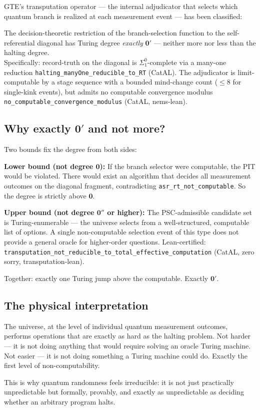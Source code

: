 \documentclass[11pt,a4paper]{article}
\newcommand{\lean}[1]{\texttt{#1}}
\begin{document}
GTE's transputation operator — the internal adjudicator that selects which quantum
branch is realized at each measurement event — has been classified:

\begin{tcolorbox}[colback=boxpurple,colframe=purple!50!black,
  title={The Turing-Degree Classification Theorem (CatAL)}]
The decision-theoretic restriction of the branch-selection function to the
self-referential diagonal has Turing degree \emph{exactly} $\mathbf{0}'$ — neither
more nor less than the halting degree.\\[4pt]
Specifically: record-truth on the diagonal is $\Sigma^0_1$-complete via a
many-one reduction \lean{halting\_manyOne\_reducible\_to\_RT} (CatAL).
The adjudicator is limit-computable by a stage sequence with a bounded mind-change
count ($\leq 8$ for single-kink events), but admits no computable convergence modulus
\lean{no\_computable\_convergence\_modulus} (CatAL, nems-lean).
\end{tcolorbox}

\subsection{Why exactly $\mathbf{0}'$ and not more?}

Two bounds fix the degree from both sides:

\textbf{Lower bound (not degree $\mathbf{0}$):} If the branch selector were computable,
the PIT would be violated.  There would exist an algorithm that decides all
measurement outcomes on the diagonal fragment, contradicting \lean{asr\_rt\_not\_computable}.
So the degree is strictly above $\mathbf{0}$.

\textbf{Upper bound (not degree $\mathbf{0}''$ or higher):} The PSC-admissible
candidate set is Turing-enumerable — the universe selects from a well-structured,
computable list of options.  A single non-computable selection event of this type
does not provide a general oracle for higher-order questions.
Lean-certified: \lean{transputation\_not\_reducible\_to\_total\_effective\_computation}
(CatAL, zero sorry, transputation-lean).

Together: exactly one Turing jump above the computable.  Exactly $\mathbf{0}'$.

\subsection{The physical interpretation}

\begin{tcolorbox}[colback=boxblue,colframe=blue!40!black,title=Plain English]
The universe, at the level of individual quantum measurement outcomes, performs
operations that are exactly as hard as the halting problem.  Not harder — it is not
doing anything that would require solving an oracle Turing machine.  Not easier — it is
not doing something a Turing machine could do.  Exactly the first level of
non-computability.

This is why quantum randomness feels irreducible: it is not just practically
unpredictable but formally, provably, and exactly as unpredictable as deciding
whether an arbitrary program halts.
\end{tcolorbox}
\end{document}
